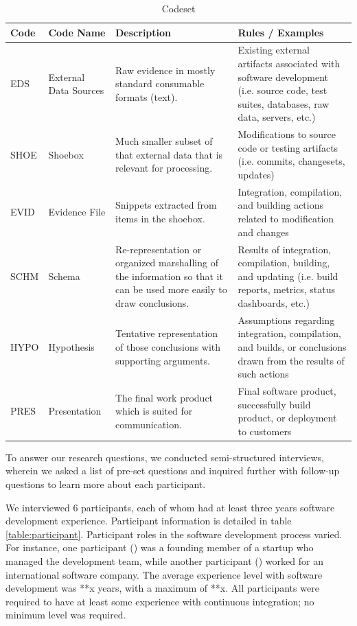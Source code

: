 \documentclass{sig-alternate}
\begin{document}
\begin{table}
\label{table:codeset}
\centering
\caption{Codeset}
\begin{tabular}[b]{ | l | l | p{5.5cm} | p{6.5cm} | }
	\hline
	\rowcolor{black!20!} Code & Code Name & Description & Rules / Examples \\ \hline
	EDS & External Data Sources & Raw evidence in mostly standard consumable formats (text). & Existing external artifacts associated with software development (i.e. source code, test suites, databases, raw data, servers, etc.) \\ \hline
	SHOE & Shoebox & Much smaller subset of that external data that is relevant for processing. & Modifications to source code or testing artifacts (i.e. commits, changesets, updates) \\ \hline
	EVID & Evidence File & Snippets extracted from items in the shoebox. & Integration, compilation, and building actions related to modification and changes \\ \hline
	SCHM & Schema & Re-representation or organized marshalling of the information so that it can be used more easily to draw conclusions. & Results of integration, compilation, building, and updating (i.e. build reports, metrics, status dashboards, etc.) \\ \hline
	HYPO & Hypothesis & Tentative representation of those conclusions with supporting arguments. & Assumptions regarding integration, compilation, and builds, or conclusions drawn from the results of such actions \\ \hline
	PRES & Presentation & The final work product which is suited for communication. & Final software product, successfully build product, or deployment to customers \\ \hline
\end{tabular}
\end{table}

To answer our research questions, we conducted semi-structured interviews, wherein we asked a list of pre-set questions and inquired further with follow-up questions to learn more about each participant.

We interviewed 6 participants, each of whom had at least three years software development experience. Participant information is detailed in table \ref{table:participant}. Participant roles in the software development process varied. For instance, one participant (\cpg) was a founding member of a startup who managed the development team, while another participant (\david) worked for an international software company. The average experience level with software development was **x years, with a maximum of **x. All participants were required to have at least some experience with continuous integration; no minimum level was required.
\end{document}
